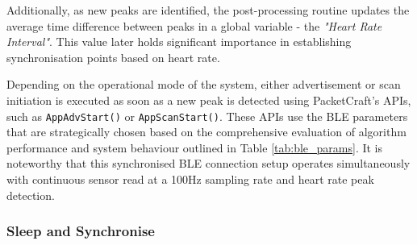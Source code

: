 \noindent Additionally, as new peaks are identified, the post-processing routine updates the average time difference between peaks in a global variable - the \textit{"Heart Rate Interval"}. This value later holds significant importance in establishing synchronisation points based on heart rate.
\vspace{1\baselineskip}

\noindent Depending on the operational mode of the system, either advertisement or scan initiation is executed as soon as a new peak is detected using PacketCraft's APIs, such as \texttt{AppAdvStart()} or \texttt{AppScanStart()}.  These APIs use the BLE parameters that are strategically chosen based on the comprehensive evaluation of algorithm performance and system behaviour outlined in Table \ref{tab:ble_params}. It is noteworthy that this synchronised BLE connection setup operates simultaneously with continuous sensor read at a 100Hz sampling rate and heart rate peak detection.

\subsubsection{Sleep and Synchronise}



